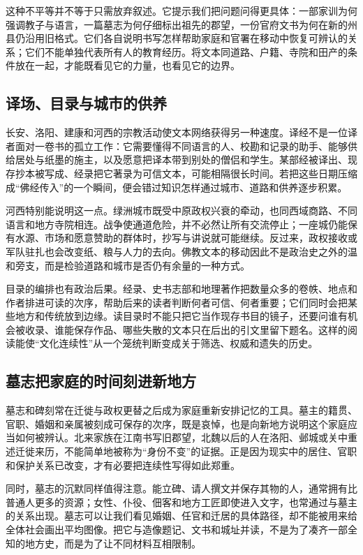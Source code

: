 这种不平等并不等于只需放弃叙述。它提示我们把问题问得更具体：一部家训为何强调教子与语言，一篇墓志为何仔细标出祖先的郡望，一份官府文书为何在新的州县仍沿用旧格式。它们各自说明书写怎样帮助家庭和官署在移动中恢复可辨认的关系；它们不能单独代表所有人的教育经历。将文本同道路、户籍、寺院和田产的条件放在一起，才能既看见它的力量，也看见它的边界。

\subsection{译场、目录与城市的供养}

长安、洛阳、建康和河西的宗教活动使文本网络获得另一种速度。译经不是一位译者面对一卷书的孤立工作：它需要懂得不同语言的人、校勘和记录的助手、能够供给居处与纸墨的施主，以及愿意把译本带到别处的僧侣和学生。某部经被译出、现存抄本被写成、经录把它著录为可信文本，可能相隔很长时间。若把这些日期压缩成“佛经传入”的一个瞬间，便会错过知识怎样通过城市、道路和供养逐步积累。

河西特别能说明这一点。绿洲城市既受中原政权兴衰的牵动，也同西域商路、不同语言和地方寺院相连。战争使通道危险，并不必然让所有交流停止；一座城仍能保有水源、市场和愿意赞助的群体时，抄写与讲说就可能继续。反过来，政权接收或军队驻扎也会改变纸、粮与人力的去向。佛教文本的移动因此不是政治史之外的温和旁支，而是检验道路和城市是否仍有余量的一种方式。

目录的编排也有政治后果。经录、史书志部和地理著作把数量众多的卷帙、地点和作者排进可读的次序，帮助后来的读者判断何者可信、何者重要；它们同时会把某些地方和传统放到边缘。读目录时不能只把它当作现存书目的镜子，还要问谁有机会被收录、谁能保存作品、哪些失散的文本只在后出的引文里留下题名。这样的阅读能使“文化连续性”从一个笼统判断变成关于筛选、权威和遗失的历史。

\subsection{墓志把家庭的时间刻进新地方}

墓志和碑刻常在迁徙与政权更替之后成为家庭重新安排记忆的工具。墓主的籍贯、官职、婚姻和亲属被刻成可保存的次序，既是哀悼，也是向新地方说明这个家庭应当如何被辨认。北来家族在江南书写旧郡望，北魏以后的人在洛阳、邺城或关中重述迁徙来历，不能简单地被称为“身份不变”的证据。正是因为现实中的居住、官职和保护关系已改变，才有必要把连续性写得如此郑重。

同时，墓志的沉默同样值得注意。能立碑、请人撰文并保存其物的人，通常拥有比普通人更多的资源；女性、仆役、佃客和地方工匠即使进入文字，也常通过与墓主的关系出现。墓志可以让我们看见婚姻、任官和迁居的具体路径，却不能被用来给全体社会画出平均图像。把它与造像题记、文书和城址并读，不是为了凑齐一部全知的地方史，而是为了让不同材料互相限制。


